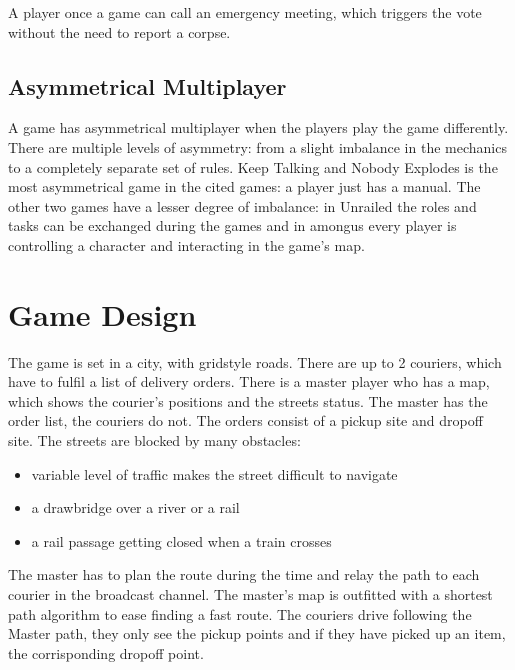 \documentclass{article}
\begin{document}
\vspace{0.4cm}
A player once a game can call an emergency meeting, which triggers the vote without the need to report a corpse.

\vfill
{}

\clearpage

\subsection{Asymmetrical Multiplayer}
A game has asymmetrical multiplayer when the players play the game differently. There are multiple levels of asymmetry: from a slight imbalance in the mechanics to a completely separate set of rules. Keep Talking and Nobody Explodes is the most asymmetrical game in the cited games: a player just has a manual. The other two games have a lesser degree of imbalance: in Unrailed the roles and tasks can be exchanged during the games and in amongus every player is controlling a character and interacting in the game's map.

\clearpage

\section{Game Design}
The game is set in a city, with gridstyle roads.
There are up to 2 couriers, which have to fulfil a list of delivery orders.
There is a master player who has a map, which shows the courier's positions and the streets status. The master has the order list, the couriers do not.
The orders consist of a pickup site and dropoff site.
The streets are blocked by many obstacles:
\begin{itemize}
  \item variable level of traffic makes the street difficult to navigate
  \item a drawbridge over a river or a rail
  \item a rail passage getting closed when a train crosses
\end{itemize}
The master has to plan the route during the time and relay the path to each courier in the broadcast channel.
The master's map is outfitted with a shortest path algorithm to ease finding a fast route.
The couriers drive following the Master path, they only see the pickup points and if they have picked up an item, the corrisponding dropoff point.
\end{document}
